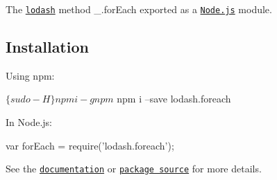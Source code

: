 The \href{https://lodash.com/}{\tt lodash} method {\ttfamily \+\_\+.\+for\+Each} exported as a \href{https://nodejs.org/}{\tt Node.\+js} module.

\subsection*{Installation}

Using npm\+: 
\begin{DoxyCode}
$ \{sudo -H\} npm i -g npm
$ npm i --save lodash.foreach
\end{DoxyCode}


In Node.\+js\+: 
\begin{DoxyCode}
var forEach = require('lodash.foreach');
\end{DoxyCode}


See the \href{https://lodash.com/docs#forEach}{\tt documentation} or \href{https://github.com/lodash/lodash/blob/4.5.0-npm-packages/lodash.foreach}{\tt package source} for more details. 
